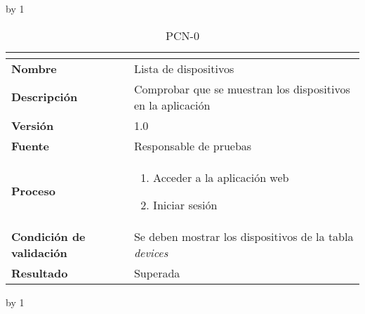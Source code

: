 \advance\pcn by 1
\begin{table}[H]
	\caption{PCN-0\number\pcn}
	\begin{tabular}{|l|p{}|}
		\hline
		\multicolumn{2}{|c|}{\cellcolor[HTML]{BFBFBF}{\color[HTML]{000000} \textbf{PCN-0\number\pcn}}} \\ \hline
		\textbf{Nombre}                  & Lista de dispositivos                                          \\ \hline
		\textbf{Descripción}             & Comprobar que se muestran los dispositivos en la aplicación    \\ \hline
		\textbf{Versión}                 & 1.0                                                            \\ \hline
		\textbf{Fuente}                  & Responsable de pruebas                                         \\ \hline
		\textbf{Proceso}                 & \begin{enumerate}
			\item Acceder a la aplicación web
			\item Iniciar sesión
		\end{enumerate}                                     \\ \hline
		\textbf{Condición de validación} & Se deben mostrar los dispositivos de la tabla \textit{devices} \\ \hline
		\textbf{Resultado}               & Superada                                                       \\ \hline
	\end{tabular}
\end{table}
\advance\pcn by 1
